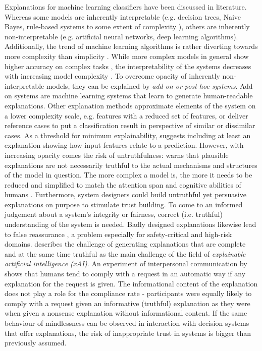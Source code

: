 Explanations for machine learning classifiers have been discussed in literature. 
Whereas some models are inherently interpretable (e.g. decision trees, Naive Bayes, rule-based systems to some extent of complexity \cite{kotsiantis2007supervised}), others are inherently non-interpretable (e.g. artificial neural networks, deep learning algorithms). Additionally, the trend of machine learning algorithms is rather diverting towards more complexity than simplicity \cite{arras2017relevant}. While more complex models in general show higher accuracy on complex tasks \cite{richardson2018survey}, the interpretability of the systems decreases with increasing model complexity \cite{chen2018learning}. To overcome opacity of inherently non-interpretable models, they can be explained by \textit{add-on or post-hoc systems}. Add-on systems are machine learning systems that learn to generate human-readable explanations. Other explanation methods approximate elements of the system on a lower complexity scale, e.g. features with a reduced set of features, or deliver reference cases to put a classification result in perspective of similar or dissimilar cases. As a threshold for minimum explainability, \cite{goodman16eu} suggests including at least an explanation showing how input features relate to a prediction.\medskip \newline
However, with increasing opacity comes the risk of untruthfulness: \cite{lipton2016mythos} warns that plausible explanations are not necessarily truthful to the actual mechanisms and structures of the model in question. The more complex a model is, the more it needs to be reduced and simplified to match the attention span and cognitive abilities of humans \cite{kulesza2013too}. Furthermore, system designers could build untruthful yet persuasive explanations on purpose to stimulate trust building. To come to an informed judgement about a system's integrity or fairness, correct (i.e. truthful) understanding of the system is needed. Badly designed explanations likewise lead to false reassurance \cite{burrell2016machine}, a problem especially for safety-critical and high-risk domains. \cite{gilpin2018explaining} describes the challenge of generating explanations that are complete and at the same time truthful as the main challenge of the field of \textit{explainable artificial intelligence (xAI)}.\newline
An experiment of interpersonal communication by \cite{langer1978mindlessness} shows that humans tend to comply with a request in an automatic way if any explanation for the request is given. The informational content of the explanation does not play a role for the compliance rate - participants were equally likely to comply with a request given an informative (truthful) explanation as they were when given a nonsense explanation without informational content. If the same behaviour of mindlessness can be observed in interaction with decision systems that offer explanations, the risk of inappropriate trust in systems is bigger than previously assumed.\medskip \newline
